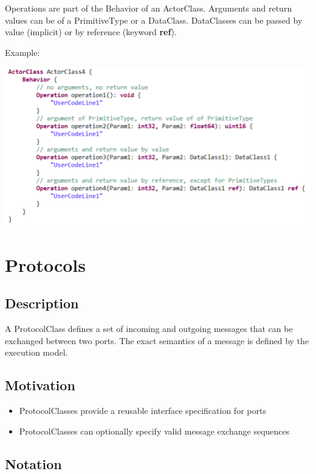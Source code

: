 Operations are part of the Behavior of an ActorClass.  Arguments and return values can be of a 
PrimitiveType or a DataClass. DataClasses can be passed by value (implicit) or by reference (keyword 
\textbf{ref}).

Example:

\includegraphics{images/040-ActorClassOperations.png}

\section{Protocols}

\subsection{Description}

A ProtocolClass defines a set of incoming and outgoing messages that can be exchanged between two ports.
The exact semantics of a message is defined by the execution model.

\subsection{Motivation}

\begin{itemize}
\item ProtocolClasses provide a reusable interface specification for ports
\item ProtocolClasses can optionally specify valid message exchange sequences
\end{itemize}

\subsection{Notation}

